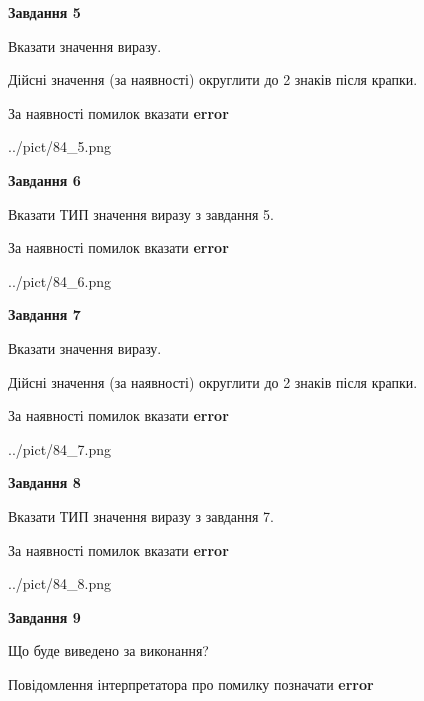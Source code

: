 \documentclass[11pt, ukrainian]{article}
\begin{document}
{\begin {large}
{\begin {center}\textbf{Завдання 5}\end {center}}\par
Вказати значення виразу. \par
Дійсні значення (за наявності) округлити до 2 знаків після крапки. \par
За наявності помилок вказати \textbf{error}

\begin{center}
	{../pict/84_5.png}
\end{center}
\newpage

{\begin {center}\textbf{Завдання 6}\end {center}}\par
Вказати ТИП значення виразу з завдання 5. \par
За наявності помилок вказати \textbf{error}

\begin{center}
	{../pict/84_6.png}
\end{center}
\newpage

{\begin {center}\textbf{Завдання 7}\end {center}}\par
Вказати значення виразу. \par
Дійсні значення (за наявності) округлити до 2 знаків після крапки. \par
За наявності помилок вказати \textbf{error}

\begin{center}
	{../pict/84_7.png}
\end{center}
\newpage

{\begin {center}\textbf{Завдання 8}\end {center}}\par
Вказати ТИП значення виразу з завдання 7. \par
За наявності помилок вказати \textbf{error}

\begin{center}
	{../pict/84_8.png}
\end{center}
\newpage

{\begin {center}\textbf{Завдання 9}\end {center}}\par
Що буде виведено за виконання? \par
Повідомлення інтерпретатора про помилку позначати \textbf{error}


\end{large}}
\end{document}
